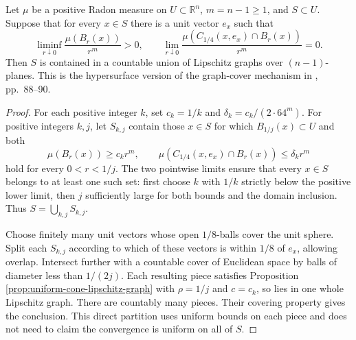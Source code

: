 \begin{theorem}\label{thm:pointwise-cone-graph-cover}
Let $\mu$ be a positive Radon measure on $U\subset\mathbb R^n$, $m=n-1\geq1$, and $S\subset U$. Suppose that for every $x\in S$ there is a unit vector $e_x$ such that
\[
 \liminf_{r\downarrow0}\frac{\mu(B_r(x))}{r^m}>0,
 \qquad
 \lim_{r\downarrow0}\frac{\mu(C_{1/4}(x,e_x)\cap B_r(x))}{r^m}=0.
\]
Then $S$ is contained in a countable union of Lipschitz graphs over $(n-1)$-planes. This is the hypersurface version of the graph-cover mechanism in \cite{Sim18}, pp.~88--90.
\end{theorem}
\begin{proof}
For each positive integer $k$, set $c_k=1/k$ and $\delta_k=c_k/(2\cdot64^m)$. For positive integers $k,j$, let $S_{k,j}$ contain those $x\in S$ for which $B_{1/j}(x)\subset U$ and both
\[
 \mu(B_r(x))\geq c_kr^m,\qquad
 \mu(C_{1/4}(x,e_x)\cap B_r(x))\leq\delta_kr^m
\]
hold for every $0<r<1/j$. The two pointwise limits ensure that every $x\in S$ belongs to at least one such set: first choose $k$ with $1/k$ strictly below the positive lower limit, then $j$ sufficiently large for both bounds and the domain inclusion. Thus $S=\bigcup_{k,j}S_{k,j}$.

Choose finitely many unit vectors whose open $1/8$-balls cover the unit sphere. Split each $S_{k,j}$ according to which of these vectors is within $1/8$ of $e_x$, allowing overlap. Intersect further with a countable cover of Euclidean space by balls of diameter less than $1/(2j)$. Each resulting piece satisfies Proposition \ref{prop:uniform-cone-lipschitz-graph} with $\rho=1/j$ and $c=c_k$, so lies in one whole Lipschitz graph. There are countably many pieces. Their covering property gives the conclusion. This direct partition uses uniform bounds on each piece and does not need to claim the convergence is uniform on all of $S$.
\end{proof}


